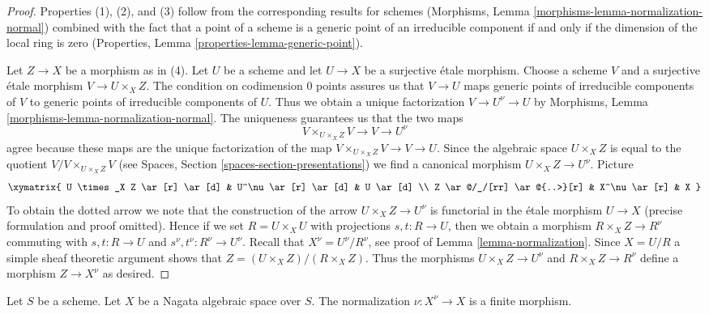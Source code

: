\begin{proof}
Properties (1), (2), and (3) follow from the corresponding results
for schemes (Morphisms, Lemma \ref{morphisms-lemma-normalization-normal})
combined with the fact that a point of a scheme is a generic
point of an irreducible component if and only if the dimension
of the local ring is zero
(Properties, Lemma \ref{properties-lemma-generic-point}).

\medskip\noindent
Let $Z \to X$ be a morphism as in (4). Let $U$ be a scheme and let
$U \to X$ be a surjective \'etale morphism. Choose a scheme $V$ and
a surjective \'etale morphism $V \to U \times_X Z$. The condition on
codimension $0$ points assures us that $V \to U$ maps generic points of
irreducible components of $V$ to generic points of irreducible
components of $U$. Thus we obtain a unique factorization
$V \to U^\nu \to U$ by
Morphisms, Lemma \ref{morphisms-lemma-normalization-normal}.
The uniqueness guarantees us that the two maps
$$
V \times_{U \times_X Z} V \to V \to U^\nu
$$
agree because these maps are the unique factorization of the map
$V \times_{U \times_X Z} V \to V \to U$.
Since the algebraic space $U \times_X Z$ is equal to the quotient
$V/V \times_{U \times_X Z} V$
(see Spaces, Section \ref{spaces-section-presentations})
we find a canonical morphism
$U \times_X Z \to U^\nu$. Picture
$$
\xymatrix{
U \times_X Z \ar[r] \ar[d] & U^\nu \ar[r] \ar[d] & U \ar[d] \\
Z \ar@/_/[rr] \ar@{..>}[r] & X^\nu \ar[r] & X
}
$$
To obtain the dotted arrow we note that the construction of the
arrow $U \times_X Z \to U^\nu$ is functorial in the \'etale morphism $U \to X$
(precise formulation and proof omitted).
Hence if we set $R = U \times_X U$ with projections $s, t : R \to U$,
then we obtain a morphism $R \times_X Z \to R^\nu$ commuting with
$s, t : R \to U$ and $s^\nu, t^\nu : R^\nu \to U^\nu$.
Recall that $X^\nu = U^\nu/R^\nu$, see proof of
Lemma \ref{lemma-normalization}. Since $X = U/R$ a
simple sheaf theoretic argument
shows that $Z = (U \times_X Z)/(R \times_X Z)$. Thus the morphisms
$U \times_X Z \to U^\nu$ and $R \times_X Z \to R^\nu$ define a
morphism $Z \to X^\nu$ as desired.
\end{proof}

\begin{lemma}
\label{lemma-nagata-normalization}
Let $S$ be a scheme. Let $X$ be a Nagata algebraic space over $S$.
The normalization $\nu : X^\nu \to X$ is a finite morphism.
\end{lemma}

